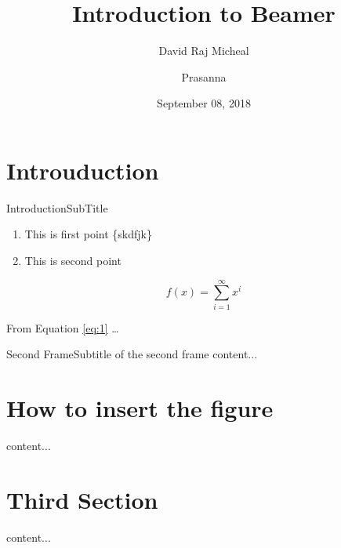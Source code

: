 \documentclass[169, 11pt]{beamer}
\title[Introduction \dots]{Introduction to Beamer}
\author[David and Prasanna]{David Raj Micheal \and Prasanna}
\date[Sep 08, 2018]{September 08, 2018}
\begin{document}



\begin{frame}
	\tableofcontents
\end{frame}
	
	
	\section{Introuduction}
\begin{frame}{Introduction}{SubTitle}
	\begin{enumerate}[label = {(\alph*)}, start = 4]
		\item This is first point \{skdfjk\}
		\item This is second point
	\end{enumerate}
\begin{equation}\label{eq:1}
f(x) = \sum_{i = 1}^ \infty x^i
\end{equation}

From Equation \ref{eq:1} \dots 
\end{frame}

\begin{frame}{Second Frame}{Subtitle of the second frame}
	content...
\end{frame}


\section{How to insert the figure}
\begin{frame}
	content...
\end{frame}

\section{Third Section}

\begin{frame}
	content...
\end{frame}
\end{document}
